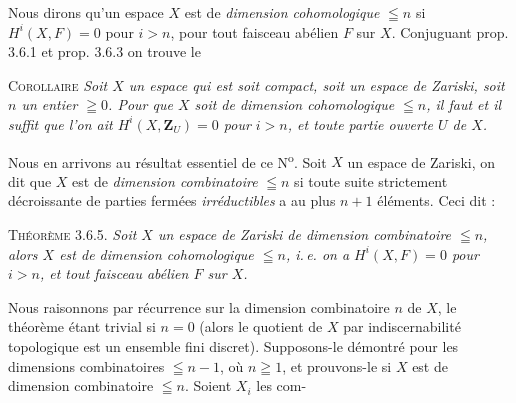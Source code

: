 Nous dirons qu'un espace $X$ est de \textit{dimension cohomologique} $\leqq n$
si $H^i(X,F)=0$ pour $i>n$, pour tout faisceau abélien $F$ sur $X$. Conjuguant
prop. 3.6.1 et prop. 3.6.3 on trouve le

\indent\textsc{Corollaire} \textit{Soit $X$ un espace qui est soit
compact, soit un espace de Zariski, soit $n$ un entier $\geqq0$. Pour que $X$
soit de dimension cohomologique $\leqq n$, il faut et il suffit que l'on ait
$H^i(X,\mathbf Z_U)=0$ pour $i>n$, et toute partie ouverte $U$ de $X$.}

Nous en arrivons au résultat essentiel de ce N\textsuperscript{o}. Soit $X$ un
espace de Zariski, on dit que $X$ est de \textit{dimension combinatoire}
$\leqq n$ si toute suite strictement décroissante de parties fermées
\textit{irréductibles} a au plus $n+1$ éléments. Ceci dit :

\indent\textsc{Théorème 3.6.5.} \textit{Soit $X$ un espace de Zariski de
dimension combinatoire $\leqq n$, alors $X$ est de dimension cohomologique
$\leqq n$, i.\,e. on a $H^i(X,F)=0$ pour $i>n$, et tout faisceau abélien $F$
sur $X$.}

Nous raisonnons par récurrence sur la dimension combinatoire $n$ de $X$, le
théorème étant trivial si $n=0$ (alors le quotient de $X$ par indiscernabilité topologique est un ensemble fini discret).
Supposons-le démontré pour les dimensions combinatoires $\leqq n-1$, où
$n\geqq1$, et prouvons-le si $X$ est de dimension combinatoire $\leqq n$.
Soient $X_i$ les com-

